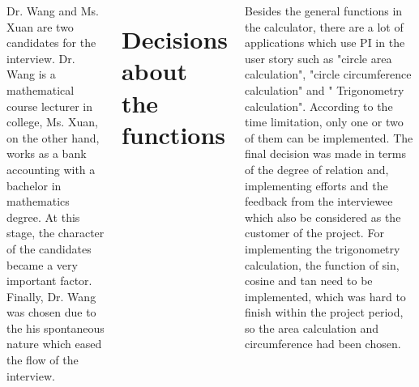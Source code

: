 \documentclass[20pt,margin=1in,innermargin=-4.5in,blockverticalspace=-0.25in]{tikzposter}
\begin{document}
\begin{columns}
{      Dr. Wang and Ms. Xuan are two candidates for the interview. Dr. Wang is a mathematical course lecturer in college, Ms. Xuan, on the other hand, works as a bank accounting with a bachelor in mathematics degree. At this stage, the character of the candidates became a very important factor. Finally, Dr. Wang was chosen due to the his spontaneous nature which eased the flow of the interview.

    \section{ Decisions about the functions }
  Besides the general functions in the calculator, there are a lot of applications which use PI in the user story such as  "circle area calculation", "circle circumference calculation" and " Trigonometry calculation".  According to the time limitation, only one or two of them can be implemented. The final decision was made in terms of the degree of relation and, implementing efforts and the feedback from the interviewee which also be considered as the customer of the project. For implementing the trigonometry calculation, the function of sin, cosine and tan need to be implemented, which was hard to finish within the project period, so the area calculation and circumference had been chosen.

    }
\end{columns}
\end{document}
